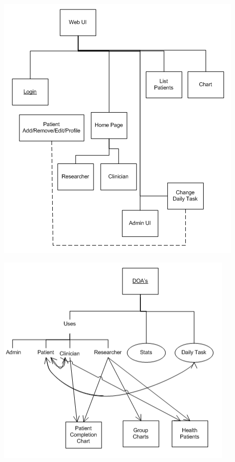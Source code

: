 \documentclass{article}
\begin{document}
\begin{center}
\includegraphics[width=4.75in,height=5.21in]{Server1_ooda.png}\label{fig: webui}
\end{center}

\begin{center}
\includegraphics[width=4.56in,height=4.09in]{Server2_ooda.png}
\end{center}
\end{document}
